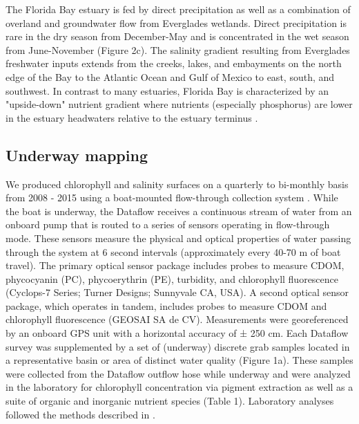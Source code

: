 The Florida Bay estuary is fed by direct precipitation as well as  a combination of overland and groundwater flow from Everglades wetlands. Direct precipitation is rare in the dry season from December-May and is concentrated in the wet season from June-November (Figure 2c). The salinity gradient resulting from Everglades freshwater inputs extends from the creeks, lakes, and embayments on the north edge of the Bay to the Atlantic Ocean and Gulf of Mexico to east, south, and southwest. In contrast to many estuaries, Florida Bay is characterized by an "upside-down" nutrient gradient where nutrients (especially phosphorus) are lower in the estuary headwaters relative to the estuary terminus \citep{childers_relating_2006}.

\subsection{Underway mapping}
\label{chlmapping}

We produced chlorophyll and salinity surfaces on a quarterly to bi-monthly basis from 2008 - 2015 using a boat-mounted flow-through collection system \citep["Dataflow", ][]{madden1992instrument}. While the boat is underway, the Dataflow receives a continuous stream of water from an onboard pump that is routed to a series of sensors operating in flow-through mode. These sensors measure the physical and optical properties of water passing through the system at 6 second intervals (approximately every 40-70 m of boat travel). The primary optical sensor package includes probes to measure CDOM, phycocyanin (PC), phycoerythrin (PE), turbidity, and chlorophyll fluorescence (Cyclops-7 Series; Turner Designs; Sunnyvale CA, USA). A second optical sensor package, which operates in tandem, includes probes to measure CDOM and chlorophyll fluorescence (GEOSAI SA de CV). Measurements were georeferenced by an onboard GPS unit with a horizontal accuracy of ± 250 cm. Each Dataflow survey was supplemented by a set of (underway) discrete grab samples located in a representative basin or area of distinct water quality (Figure 1a). These samples were collected from the Dataflow outflow hose while underway and were analyzed in the laboratory for chlorophyll concentration via pigment extraction as well as a suite of organic and inorganic nutrient species (Table 1). Laboratory analyses followed the methods described in \citep{childers_relating_2006}. 

